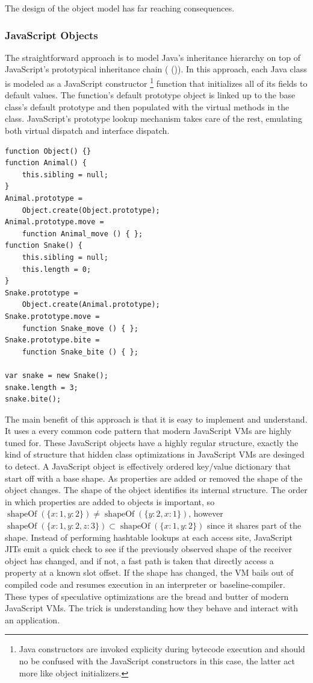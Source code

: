 \documentclass{acm_proc_article-sp}
\DeclareMathOperator{\shapeOf}{shapeOf}
\begin{document}
The design of the object model has far reaching consequences.

\subsubsection{JavaScript Objects}
The straightforward approach is to model Java's inheritance hierarchy on top of JavaScript's prototypical inheritance chain ( ()).
In this approach, each Java class is modeled as a JavaScript constructor \footnote{Java constructors are invoked explicity during bytecode execution and should no be confused with the JavaScript constructors in this case, the latter act more like object initializers.} function that initializes all of its fields to default values.
The function's default prototype object is linked up to the base class's default prototype and then populated with the virtual methods in the class.
JavaScript's prototype lookup mechanism takes care of the rest, emulating both virtual dispatch and interface dispatch.

\begin{lstlisting}[caption=Simple Object Model]
function Object() {}
function Animal() {
	this.sibling = null;
}
Animal.prototype = 
	Object.create(Object.prototype); 
Animal.prototype.move = 
	function Animal_move () { };
function Snake() {
	this.sibling = null;
	this.length = 0;
}
Snake.prototype = 
	Object.create(Animal.prototype);
Snake.prototype.move = 
	function Snake_move () { };
Snake.prototype.bite = 
	function Snake_bite () { };

var snake = new Snake();
snake.length = 3;
snake.bite();
\end{lstlisting}

The main benefit of this approach is that it is easy to implement and understand.
It uses a every common code pattern that modern JavaScript VMs are highly tuned for.
These JavaScript objects have a highly regular structure, exactly the kind of structure that hidden class optimizations in JavaScript VMs are desinged to detect.
A JavaScript object is effectively ordered key/value dictionary that start off with a base shape.
As properties are added or removed the shape of the object changes.
The shape of the object identifies its internal structure.
The order in which properties are added to objects is important, so $\shapeOf(\{x: 1, y: 2\}) \neq \shapeOf(\{y: 2, x: 1\})$, 
however $\shapeOf(\{x: 1, y: 2, z: 3\}) \subset \shapeOf(\{x: 1, y: 2\})$ since it shares part of the shape.
Instead of performing hashtable lookups at each access site, JavaScript JITs emit a quick check to see if the previously observed shape of the receiver object has changed, and if not, a fast path is taken that directly access a property at a known slot offset.
If the shape has changed, the VM bails out of compiled code and resumes execution in an interpreter or baseline-compiler.
These types of speculative optimizations are the bread and butter of modern JavaScript VMs.
The trick is understanding how they behave and interact with an application.
\end{document}
